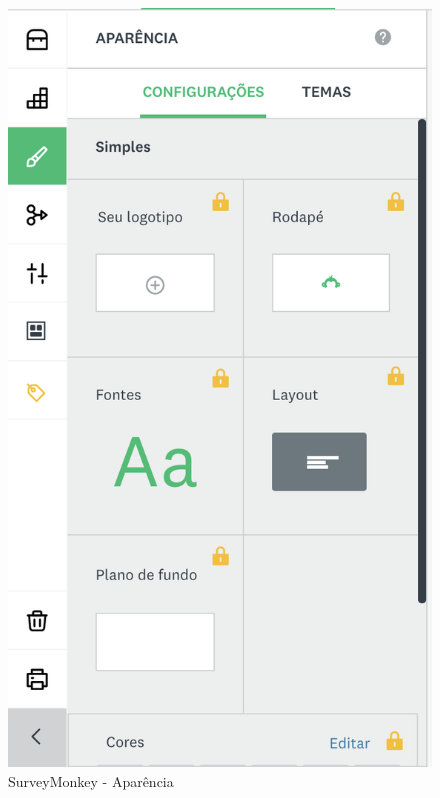 \begin{figure}[ht!]
	\begin{center}
		\begin{minipage}{0.45\textwidth}
			\begin{center}
				\includegraphics[height=.35\textheight]{img/sm/surveymonkey-form-aparencia}
				\caption{SurveyMonkey - Aparência}
				\label{fig:surveymonkey-form-aparencia}
			\end{center}
		\end{minipage}

\end{center}
\end{figure}
